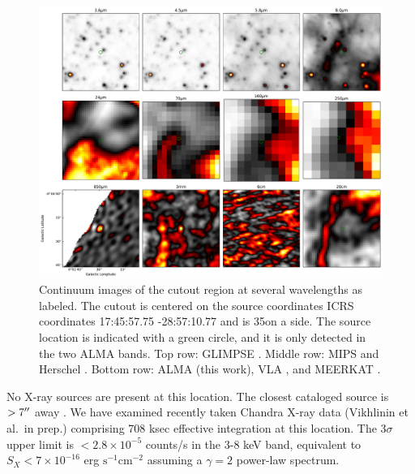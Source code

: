 \documentclass[]{aastex631}
\newcommand{\persc}{\ensuremath{\mathrm{cm}^{-2}}\xspace}
\newcommand{\pers}{\ensuremath{\mathrm{s}^{-1}}\xspace}
\begin{document}
\begin{figure}
    \centering
    \includegraphics[width=\textwidth]{figures/continuum_cutouts.pdf}
    \caption{Continuum images of the cutout region at several wavelengths as labeled.
    The cutout is centered on the source coordinates ICRS coordinates 17:45:57.75 -28:57:10.77 and is 35\arcsec on a side.
    The source location is indicated with a green circle, and it is only detected in the two ALMA bands.
    Top row: GLIMPSE \citep{Churchwell2009}.
    Middle row: MIPS \citep{Carey2009} and Herschel \citep{Traficante2011}.
    Bottom row: ALMA (this work), VLA \citep{Lu2019}, and MEERKAT \citep{Heywood2022}.
    }
    \label{fig:contcutouts}
\end{figure}

No X-ray sources are present at this location.
The closest cataloged source is $>7\mbox{$^{\prime\prime}$}$ away \citep{Muno2009}.
We have examined recently taken Chandra X-ray data (Vikhlinin et al.~in prep.) comprising 708 ksec effective integration at this location.
The 3$\sigma$ upper limit is $<2.8\times10^{-5}$ counts/s in the 3-8 keV band, equivalent to $S_{X}<7\times10^{-16}$ erg \pers \persc assuming a $\gamma=2$ power-law spectrum.
\end{document}

